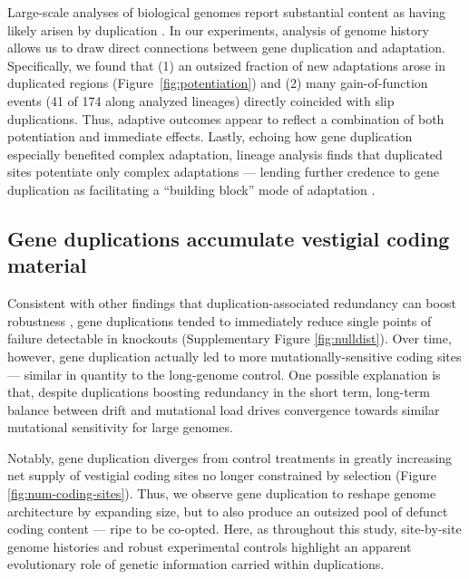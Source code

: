 Large-scale analyses of biological genomes report substantial content as having likely arisen by duplication \citep{teichmann_structural_1998,Teichmann:2004cz}.
In our experiments, analysis of genome history allows us to draw direct connections between gene duplication and adaptation.
Specifically, we found that (1) an outsized fraction of new adaptations arose in duplicated regions (Figure~\ref{fig:potentiation}) and (2) many gain-of-function events (41 of 174 along analyzed lineages) directly coincided with slip duplications.
Thus, adaptive outcomes appear to reflect a combination of both potentiation and immediate effects.
Lastly, echoing how gene duplication especially benefited complex adaptation, lineage analysis finds that duplicated sites potentiate only complex adaptations --- lending further credence to gene duplication as facilitating a ``building block'' mode of adaptation \citep{Jacob1977}.

\subsection{Gene duplications accumulate vestigial coding material}

Consistent with other findings that duplication-associated redundancy can boost robustness \citep{Lynch2000}, gene duplications tended to immediately reduce single points of failure detectable in knockouts (Supplementary Figure \ref{fig:nulldist}).
Over time, however, gene duplication actually led to more mutationally-sensitive coding sites --- similar in quantity to the long-genome control.
One possible explanation is that, despite duplications boosting redundancy in the short term, long-term balance between drift and mutational load drives convergence towards similar mutational sensitivity for large genomes.

Notably, gene duplication diverges from control treatments in greatly increasing net supply of vestigial coding sites no longer constrained by selection (Figure \ref{fig:num-coding-sites}).
Thus, we observe gene duplication to reshape genome architecture by expanding size, but to also produce an outsized pool of defunct coding content --- ripe to be co-opted.
Here, as throughout this study, site-by-site genome histories and robust experimental controls highlight an apparent evolutionary role of genetic information carried within duplications.

